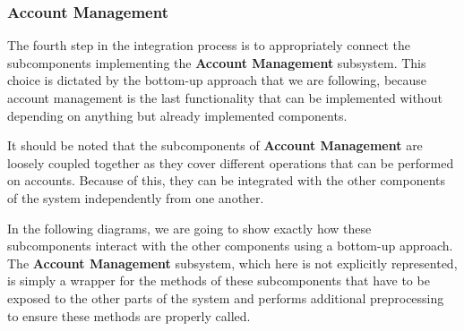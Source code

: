 \subsubsection*{Account Management}
The fourth step in the integration process is to appropriately connect the subcomponents implementing the \textbf{Account Management} subsystem. This choice is dictated by the bottom-up approach that we are following, because account management is the last functionality that can be implemented without depending on anything but already implemented components. 

It should be noted that the subcomponents of \textbf{Account Management} are loosely coupled together as they cover different operations that can be performed on accounts. Because of this, they can be integrated with the other components of the system independently from one another. 

In the following diagrams, we are going to show exactly how these subcomponents interact with the other components using a bottom-up approach. The \textbf{Account Management} subsystem, which here is not explicitly represented, is simply a wrapper for the methods of these subcomponents that have to be exposed to the other parts of the system and performs additional preprocessing to ensure these methods are properly called.
\begin{figure}[H]
\centering
{}
\end{figure}
\begin{figure}[H]
\centering
{}
\end{figure}
\begin{figure}[H]
\centering
{}
\end{figure}
\begin{figure}[H]
\centering
{}
\end{figure}
\pagebreak
